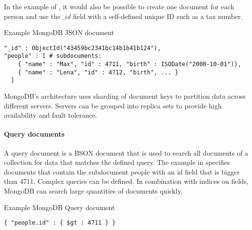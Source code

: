 In the example of , it would also be possible to create one document for each person and use the $\_id$ field with a self-defined unique ID such as a tax number.

\begin{tcbcode}[label={lst:mongoJSON}]{Example MongoDB JSON document}
\begin{lstlisting}
"_id" : ObjectId("43459bc2341bc14b1b41b124"),
"people" : [ # subdocuments:
    { "name" : "Max", "id" : 4711, "birth" : ISODate("2000-10-01")},
    { "name" : "Lena", "id" : 4712, "birth", ... }
  ]
\end{lstlisting}
\end{tcbcode}


MongoDB's architecture uses sharding of document keys to partition data across different servers.
Servers can be grouped into replica sets to provide high availability and fault tolerance.

\paragraph{Query documents}

A query document is a BSON document that is used to search all documents of a collection for data that matches the defined query.
The example in  specifies documents that contain the subdocument people with an id field that is bigger than 4711.
Complex queries can be defined.
In combination with indices on fields, MongoDB can search large quantities of documents quickly.

\begin{tcbcode}[label={lst:mongoQuery}]{Example MongoDB Query document}
\begin{lstlisting}
{ "people.id" : { $gt : 4711 } }
\end{lstlisting}
\end{tcbcode}
